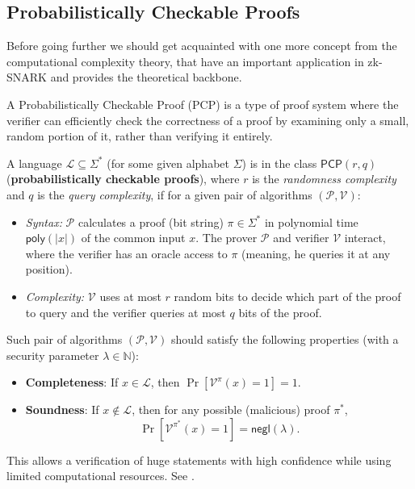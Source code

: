 \documentclass[../lecture-notes.tex]{subfiles}
\begin{document}
\subsection{Probabilistically Checkable Proofs}

Before going further we should get acquainted with one more concept from the computational 
complexity theory, that have an important application in zk-SNARK and provides the theoretical 
backbone. 

A Probabilistically Checkable Proof (PCP) is a type of proof system where the verifier can 
efficiently check the correctness of a proof by examining only a small, random portion of it, rather
than verifying it entirely. 
\begin{definition}
    A language $\mathcal{L} \subseteq \Sigma^*$ (for some given alphabet $\Sigma$) is in the class $\mathsf{PCP}(r,q)$ (\textbf{probabilistically checkable proofs}), 
    where $r$ is the \emph{randomness complexity} and $q$ is the \emph{query complexity}, 
    if for a given pair of algorithms $(\mathcal{P}, \mathcal{V})$: 
    \begin{itemize}
        \item \emph{Syntax:} $\mathcal{P}$ calculates a proof (bit string) $\pi \in \Sigma^*$ in polynomial time $\mathsf{poly}(|x|)$ of the common input $x$. The prover $\mathcal{P}$ and verifier $\mathcal{V}$ interact, where the verifier has an oracle access to $\pi$ (meaning, he queries it at any position).
        \item \emph{Complexity:} $\mathcal{V}$ uses at most $r$ random bits to decide which part of the proof to 
        query and the verifier queries at most $q$ bits of the proof.
    \end{itemize}
    
    Such pair of algorithms $(\mathcal{P}, \mathcal{V})$ should satisfy the following properties (with a security parameter $\lambda \in \mathbb{N}$):
    \begin{itemize}
        \item \textbf{Completeness}: If $x \in \mathcal{L}$, then $\Pr[\mathcal{V}^{\pi}(x) = 1] = 1$.
        \item \textbf{Soundness}: If $x \notin \mathcal{L}$, then for any possible (malicious) proof $\pi^*$, 
        \begin{equation*}
            \Pr[\mathcal{V}^{\pi^*}(x) = 1] = \mathsf{negl}(\lambda).
        \end{equation*}
    \end{itemize}
\end{definition}
This allows a verification of huge statements with high confidence while using limited computational
resources. See .
\end{document}
